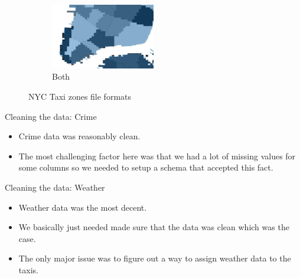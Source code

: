 \documentclass[10pt,ignorenonframetext,]{beamer}
\providecommand{\tightlist}{%
  \setlength{\itemsep}{0pt}\setlength{\parskip}{0pt}}
\begin{document}
\begin{frame}

\begin{figure}
    \begin{subfigure}[t]{0.8\textwidth}
        \centering
        \label{fig:zones_both}
        \includegraphics[width=0.5\textwidth]{../latex/images/both}
        \caption{Both}
    \end{subfigure}
    \caption{NYC Taxi zones file formats}
\end{figure}

\end{frame}

\begin{frame}

\begin{block}{Cleaning the data: Crime}

\begin{itemize}
\tightlist
\item
  Crime data was reasonably clean.
\item
  The most challenging factor here was that we had a lot of missing
  values for some columns so we needed to setup a schema that accepted
  this fact.
\end{itemize}

\end{block}

\begin{block}{Cleaning the data: Weather}

\begin{itemize}
\tightlist
\item
  Weather data was the most decent.
\item
  We basically just needed made sure that the data was clean which was
  the case.
\item
  The only major issue was to figure out a way to assign weather data to
  the taxis.
\end{itemize}

\end{block}

\end{frame}
\end{document}
